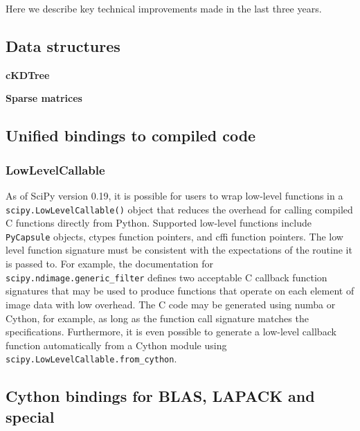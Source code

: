 \documentclass[fleqn,10pt]{wlscirep}
\begin{document}
Here we describe key technical improvements made in the last three years.

\subsection*{Data structures}
\textbf{cKDTree}

\textbf{Sparse matrices}

\subsection*{Unified bindings to compiled code}
\subsubsection*{LowLevelCallable}
As of SciPy version 0.19, it is possible for users to wrap low-level
functions in a \texttt{scipy.LowLevelCallable()} object that reduces
the overhead for calling compiled C functions directly from Python.
Supported low-level functions include \texttt{PyCapsule} objects,
ctypes function pointers, and cffi function pointers. The low level
function signature must be consistent with the expectations of the
routine it is passed to. For example, the documentation for
\texttt{scipy.ndimage.generic\_filter} defines two acceptable C callback
function signatures that may be used to produce functions that operate
on each element of image data with low overhead. The C code may be
generated using numba or Cython, for example, as long as the function
call signature matches the specifications. Furthermore, it is even
possible to generate a low-level callback function automatically
from a Cython module using \texttt{scipy.LowLevelCallable.from\_cython}.

\subsection*{Cython bindings for BLAS, LAPACK and special}
\end{document}
